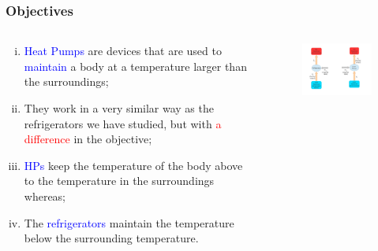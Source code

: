 \documentclass[10pt,compress,handout,ignorenonframetext]{beamer}
\begin{document}
\begin{frame}
 \frametitle{Objectives}
  \begin{columns}
   \begin{column}[c]{0.45\linewidth}
  \begin{enumerate}[(i)]
   \item <1-> \textcolor{blue}{Heat Pumps} are devices that are used to \textcolor{blue}{maintain} a body at a temperature larger than the surroundings;
   \item <2-> They work in a very similar way as the refrigerators we have studied, but with \textcolor{red}{a difference} in the objective;
   \item <3-> \textcolor{blue}{HPs} keep the temperature of the body above to the temperature in the surroundings whereas;
   \item <4-> The \textcolor{blue}{refrigerators} maintain the temperature below the surrounding temperature.
  \end{enumerate}
   \end{column}
   \begin{column}[c]{0.55\linewidth}
    \begin{figure}%
     \begin{center}
      \includegraphics[width=7.5cm,clip]{./Pics/Overview_Refrig2}
     \end{center}
    \end{figure}  
   \end{column}  
  \end{columns}
\end{frame}
\end{document}
